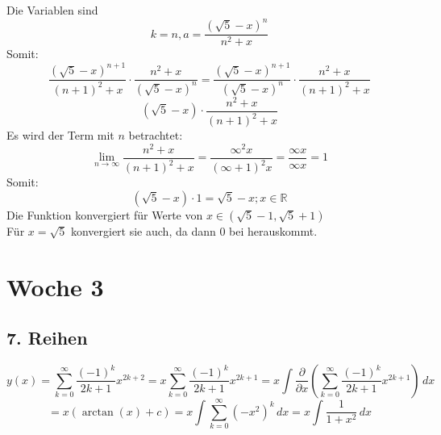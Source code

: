 \documentclass{article}
\begin{document}
    Die Variablen sind
    \begin{equation*}
        k = n, a = \frac{(\sqrt{5}-x)^n}{n^2+x}
    \end{equation*}
    Somit:
    \begin{equation*}
        \frac{(\sqrt{5}-x)^{n+1}}{(n+1)^2 + x} \cdot \frac{n^2 + x}{(\sqrt{5}-x)^n} = \frac{(\sqrt{5}-x)^{n+1}}{(\sqrt{5}-x)^n} \cdot \frac{n^2 + x}{(n+1)^2 + x}
    \end{equation*}
    \begin{equation*}
        (\sqrt{5}-x) \cdot \frac{n^2 + x}{(n+1)^2 + x}
    \end{equation*}
    Es wird der Term mit $n$ betrachtet:
    \begin{equation*}
        \lim_{n \to \infty} \frac{n^2 + x}{(n+1)^2 + x} = \frac{\infty^2 x}{(\infty+1)^2 x} = \frac{\infty x}{\infty x} = 1
    \end{equation*}
    Somit:
    \begin{equation*}
        (\sqrt{5}-x)\cdot 1 = \sqrt{5}-x; x \in \mathbb{R}
    \end{equation*}
    Die Funktion konvergiert für Werte von $x \in (\sqrt{5}-1, \sqrt{5}+1)$\\
    Für $x = \sqrt{5}$ konvergiert sie auch, da dann 0 bei herauskommt.


    \section*{Woche 3}

    \subsection*{7. Reihen}
    \begin{equation*}
        y(x) = \sum_{k=0}^{\infty} \frac{(-1)^k}{2k+1}x^{2k+2} = x \sum_{k=0}^{\infty} \frac{(-1)^k}{2k+1}x^{2k+1} = x \int \frac{\partial}{\partial x} \left(\sum_{k=0}^{\infty} \frac{(-1)^k}{2k+1}x^{2k+1}\right) \, dx  
    \end{equation*}
    \begin{equation*}
        = x \left(\arctan(x) + c\right) = x \int \sum_{k=0}^{\infty} (-x^2)^k \, dx = x \int \frac{1}{1+x^2} \, dx
    \end{equation*}
\end{document}
